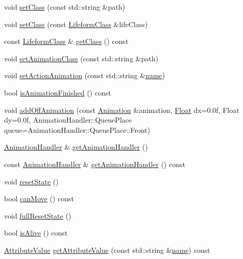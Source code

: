 \begin{DoxyCompactItemize}
void \hyperlink{classZeta_1_1Lifeform_a330cd11468675e9fc215e5649d281f7b}{set\+Class} (const std\+::string \&path)
\item 
void \hyperlink{classZeta_1_1Lifeform_aafcbf8a714e30af1ec7ec0fc60fa6c1b}{set\+Class} (const \hyperlink{classZeta_1_1LifeformClass}{Lifeform\+Class} \&life\+Class)
\item 
const \hyperlink{classZeta_1_1LifeformClass}{Lifeform\+Class} \& \hyperlink{classZeta_1_1Lifeform_ab1bc9310d2e8130afe9c06b9e926bc03}{get\+Class} () const 
\item 
void \hyperlink{classZeta_1_1Lifeform_adaf04a24d29a8651ddbb5d3332d7e2df}{set\+Animation\+Class} (const std\+::string \&path)
\item 
void \hyperlink{classZeta_1_1Lifeform_acc4362ea2d4e66b0ae2fe78824a7f1f2}{set\+Action\+Animation} (const std\+::string \&\hyperlink{classZeta_1_1Object_ace4ef81b7c300e0a170292e9888cd66f}{name})
\item 
bool \hyperlink{classZeta_1_1Lifeform_a5251e65a65a6de5f83d5b9df4eceeb68}{is\+Animation\+Finished} () const 
\item 
void \hyperlink{classZeta_1_1Lifeform_ad5cc085bb836660c16371f5ed0d449e6}{add\+Off\+Animation} (const \hyperlink{classZeta_1_1Animation}{Animation} \&animation, \hyperlink{namespaceZeta_a1e0a1265f9b3bd3075fb0fabd39088ba}{Float} dx=0.\+0f, Float dy=0.\+0f, Animation\+Handler\+::\+Queue\+Place queue=\+Animation\+Handler\+::\+Queue\+Place\+::\+Front)
\item 
\hyperlink{classZeta_1_1AnimationHandler}{Animation\+Handler} \& \hyperlink{classZeta_1_1Lifeform_a8d11e612386d21634b923cfca6dc4afd}{get\+Animation\+Handler} ()
\item 
const \hyperlink{classZeta_1_1AnimationHandler}{Animation\+Handler} \& \hyperlink{classZeta_1_1Lifeform_a7035cff18ad23c446e5d15c1084172f0}{get\+Animation\+Handler} () const 
\item 
void \hyperlink{classZeta_1_1Lifeform_a37dabf5fd260c6009d23eed775502243}{reset\+State} ()
\item 
bool \hyperlink{classZeta_1_1Lifeform_acf4de0c95d32740cf9f9364de00a0463}{can\+Move} () const 
\item 
void \hyperlink{classZeta_1_1Lifeform_a07b644beaefa9f7e6425c16d1d18046b}{full\+Reset\+State} ()
\item 
bool \hyperlink{classZeta_1_1Lifeform_adc2aee9184c78aa22d2692a501b3f1ac}{is\+Alive} () const 
\item 
\hyperlink{namespaceZeta_ab5947f98c0ab6302b51f8c6e93ec5581}{Attribute\+Value} \hyperlink{classZeta_1_1Lifeform_a135b49f4390746e490aed318f3308895}{get\+Attribute\+Value} (const std\+::string \&\hyperlink{classZeta_1_1Object_ace4ef81b7c300e0a170292e9888cd66f}{name}) const 

\end{DoxyCompactItemize}
